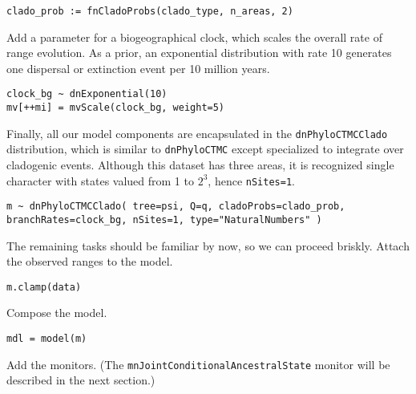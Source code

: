 \begin{snugshade}
\begin{lstlisting}
clado_prob := fnCladoProbs(clado_type, n_areas, 2)
\end{lstlisting}
\end{snugshade}

Add a parameter for a biogeographical clock, which scales the overall rate of range evolution.
As a prior, an exponential distribution with rate 10 generates one dispersal or extinction event per 10 million years.

\begin{snugshade}
\begin{lstlisting}
clock_bg ~ dnExponential(10)
mv[++mi] = mvScale(clock_bg, weight=5)
\end{lstlisting}
\end{snugshade}

Finally, all our model components are encapsulated in the {\tt dnPhyloCTMCClado} distribution, which is similar to {\tt dnPhyloCTMC} except specialized to integrate over cladogenic events. Although this dataset has three areas, it is recognized single character with states valued from 1 to $2^3$, hence {\tt nSites=1}.

\begin{snugshade}
\begin{lstlisting}
m ~ dnPhyloCTMCClado( tree=psi, Q=q, cladoProbs=clado_prob, branchRates=clock_bg, nSites=1, type="NaturalNumbers" )
\end{lstlisting}
\end{snugshade}

The remaining tasks should be familiar by now, so we can proceed briskly. Attach the observed ranges to the model.

\begin{snugshade}
\begin{lstlisting}
m.clamp(data)
\end{lstlisting}
\end{snugshade}

Compose the model.

\begin{snugshade}
\begin{lstlisting}
mdl = model(m)
\end{lstlisting}
\end{snugshade}

Add the monitors. (The {\tt mnJointConditionalAncestralState} monitor will be described in the next section.)


